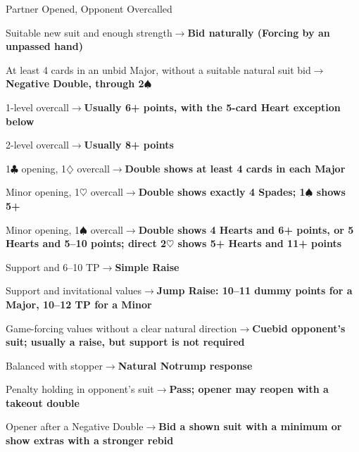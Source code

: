 \documentclass[10pt,letterpaper]{article}
\newcommand{\C}{\ensuremath{\clubsuit}}
\newcommand{\D}{\ensuremath{\diamondsuit}}
\newcommand{\Hh}{\ensuremath{\heartsuit}}
\renewcommand{\S}{\ensuremath{\spadesuit}}
\begin{document}
\begin{minipage}[t]{0.485\textwidth}\vspace{0pt}

\begin{guidecard}{Partner Opened, Opponent Overcalled}
\begin{branches}
\item Suitable new suit and enough strength\;\ensuremath{\longrightarrow}\;\textbf{Bid naturally (Forcing by an unpassed hand)}
\item At least 4 cards in an unbid Major, without a suitable natural suit bid\;\ensuremath{\longrightarrow}\;\textbf{Negative Double, through 2\S{}}
\begin{branches}
\item 1-level overcall\;\ensuremath{\longrightarrow}\;\textbf{Usually 6+ points, with the 5-card Heart exception below}
\item 2-level overcall\;\ensuremath{\longrightarrow}\;\textbf{Usually 8+ points}
\item 1\C{} opening, 1\D{} overcall\;\ensuremath{\longrightarrow}\;\textbf{Double shows at least 4 cards in each Major}
\item Minor opening, 1\Hh{} overcall\;\ensuremath{\longrightarrow}\;\textbf{Double shows exactly 4 Spades; 1\S{} shows 5+}
\item Minor opening, 1\S{} overcall\;\ensuremath{\longrightarrow}\;\textbf{Double shows 4 Hearts and 6+ points, or 5 Hearts and 5--10 points; direct 2\Hh{} shows 5+ Hearts and 11+ points}
\end{branches}
\item Support and 6--10 TP\;\ensuremath{\longrightarrow}\;\textbf{Simple Raise}
\item Support and invitational values\;\ensuremath{\longrightarrow}\;\textbf{Jump Raise: 10--11 dummy points for a Major, 10--12 TP for a Minor}
\item Game-forcing values without a clear natural direction\;\ensuremath{\longrightarrow}\;\textbf{Cuebid opponent's suit; usually a raise, but support is not required}
\item Balanced with stopper\;\ensuremath{\longrightarrow}\;\textbf{Natural Notrump response}
\item Penalty holding in opponent's suit\;\ensuremath{\longrightarrow}\;\textbf{Pass; opener may reopen with a takeout double}
\item Opener after a Negative Double\;\ensuremath{\longrightarrow}\;\textbf{Bid a shown suit with a minimum or show extras with a stronger rebid}
\end{branches}
\end{guidecard}

\end{minipage}
\end{document}
